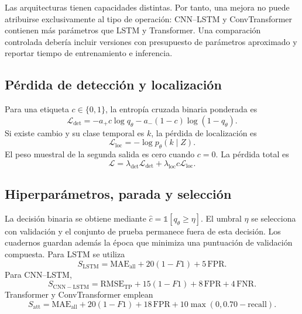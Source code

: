\documentclass[a4paper,12pt]{article}
\begin{document}
Las arquitecturas tienen capacidades distintas. Por tanto, una mejora no puede atribuirse exclusivamente al tipo de operación: CNN--LSTM y ConvTransformer contienen más parámetros que LSTM y Transformer. Una comparación controlada debería incluir versiones con presupuesto de parámetros aproximado y reportar tiempo de entrenamiento e inferencia.

\subsection{Pérdida de detección y localización}

Para una etiqueta $c\in\{0,1\}$, la entropía cruzada binaria ponderada es
\begin{equation}
  \mathcal L_{\mathrm{det}}=-a_{+}c\log q_{\theta}
  -a_{-}(1-c)\log(1-q_{\theta}).
  \label{eq:weighted-bce}
\end{equation}
Si existe cambio y su clase temporal es $k$, la pérdida de localización es
\begin{equation}
  \mathcal L_{\mathrm{loc}}=-\log p_{\theta}(k\mid Z).
  \label{eq:loc-loss}
\end{equation}
El peso muestral de la segunda salida es cero cuando $c=0$. La pérdida total es
\begin{equation}
  \mathcal L=\lambda_{\mathrm{det}}\mathcal L_{\mathrm{det}}
  +\lambda_{\mathrm{loc}}c\mathcal L_{\mathrm{loc}}.
  \label{eq:total-loss}
\end{equation}

\subsection{Hiperparámetros, parada y selección}

La decisión binaria se obtiene mediante $\widehat c=\mathbb{1}[q_{\theta}\geq\eta]$. El umbral $\eta$ se selecciona con validación y el conjunto de prueba permanece fuera de esta decisión. Los cuadernos guardan además la época que minimiza una puntuación de validación compuesta. Para LSTM se utiliza
\begin{equation}
  S_{\mathrm{LSTM}}=\mathrm{MAE}_{\mathrm{all}}+20(1-F1)+5\,\mathrm{FPR}.
  \label{eq:checkpoint-lstm}
\end{equation}
Para CNN--LSTM,
\begin{equation}
  S_{\mathrm{CNN-LSTM}}=\mathrm{RMSE}_{\mathrm{TP}}+15(1-F1)+8\,\mathrm{FPR}+4\,\mathrm{FNR}.
  \label{eq:checkpoint-cnn-lstm}
\end{equation}
Transformer y ConvTransformer emplean
\begin{equation}
  S_{\mathrm{att}}=\mathrm{MAE}_{\mathrm{all}}+20(1-F1)+18\,\mathrm{FPR}
  +10\max(0,0.70-\mathrm{recall}).
  \label{eq:checkpoint-attention}
\end{equation}
\end{document}
